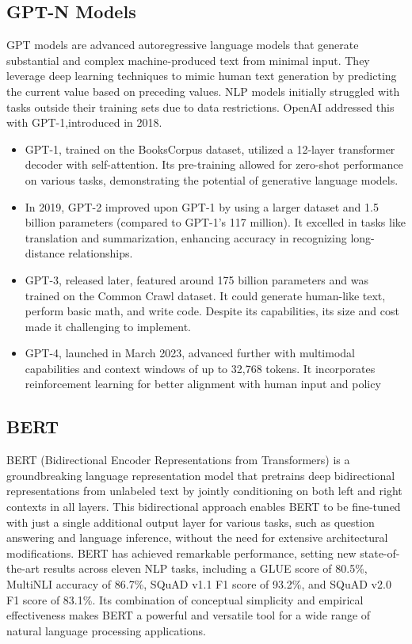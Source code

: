 \subsection{GPT-N Models}
GPT models are advanced autoregressive language models that generate substantial and complex machine-produced text from minimal input. They leverage deep learning techniques to mimic human text generation by predicting the current value based on preceding values.
NLP models initially struggled with tasks outside their training sets due to data restrictions. OpenAI addressed this with GPT-1,introduced in 2018.
\begin{itemize}
	\item GPT-1, trained on the BooksCorpus dataset, utilized a 12-layer transformer decoder with self-attention. Its pre-training allowed for zero-shot performance on various tasks, demonstrating the potential of generative language models.
	\item In 2019, GPT-2 improved upon GPT-1 by using a larger dataset and 1.5 billion parameters (compared to GPT-1’s 117 million). It excelled in tasks like translation and summarization, enhancing accuracy in recognizing long-distance relationships.
	\item GPT-3, released later, featured around 175 billion parameters and was trained on the Common Crawl dataset. It could generate human-like text, perform basic math, and write code. Despite its capabilities, its size and cost made it challenging to implement.
	\item GPT-4, launched in March 2023, advanced further with multimodal capabilities and context windows of up to 32,768 tokens. It incorporates reinforcement learning for better alignment with human input and policy\cite{yenduri2023gpt}
\end{itemize}
\subsection{BERT}
BERT (Bidirectional Encoder Representations from Transformers) is a groundbreaking language representation model that pretrains deep bidirectional representations from unlabeled text by jointly conditioning on both left and right contexts in all layers. This bidirectional approach enables BERT to be fine-tuned with just a single additional output layer for various tasks, such as question answering and language inference, without the need for extensive architectural modifications. BERT has achieved remarkable performance, setting new state-of-the-art results across eleven NLP tasks, including a GLUE score of 80.5\%, MultiNLI accuracy of 86.7\%, SQuAD v1.1 F1 score of 93.2\%, and SQuAD v2.0 F1 score of 83.1\%. Its combination of conceptual simplicity and empirical effectiveness makes BERT a powerful and versatile tool for a wide range of natural language processing applications\cite{devlin2019bert}.
